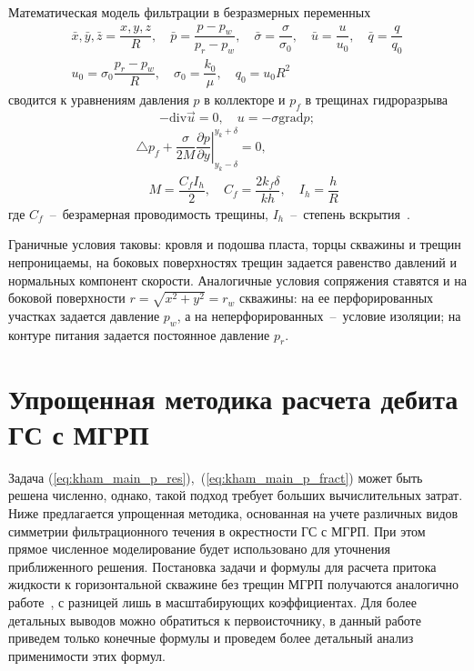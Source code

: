 \documentclass{article}
\begin{document}
Математическая модель фильтрации в безразмерных переменных
\begin{equation}
  \displaystyle
  \begin{gathered}
    \bar{x},\bar{y},\bar{z} = \dfrac{x,y,z}{R}, \quad
    \bar{p} = \dfrac{p - p_w}{p_r - p_w}, \quad
    \bar{\sigma} = \dfrac{\sigma}{\sigma_0}, \quad
    \bar{u}=\dfrac{u}{u_0},  \quad
    \bar{q} = \dfrac{q}{q_0}    \\
    u_0 = \sigma_0 \dfrac{p_r - p_w}{R}, \quad
    \sigma_0 = \dfrac{k_0}{\mu}, \quad
    q_0 = u_0 R^2
  \end{gathered}
  \label{eq:kham_dimless}
\end{equation}
сводится  к уравнениям  давления $p$ в коллекторе и $p_f$ в трещинах
гидроразрыва~\cite{ref:kham_mazo_uzku_2015}
\begin{equation}
  \displaystyle
  - \text{div} \vec{u} = 0, \quad u=-\sigma \text{grad} p;
  \label{eq:kham_main_p_res}
\end{equation}
\begin{equation}
  \displaystyle
  \begin{gathered}
    \triangle p_f + \dfrac{\sigma}{2M}\left.\dfrac{\partial p}{\partial y} \right|_{y_k - \delta}^{y_k + \delta} = 0, \\[8pt]
    \quad M = \dfrac{C_f I_h}{2}, \quad C_f = \dfrac{2 k_f \delta}{k h}, \quad I_h=\dfrac{h}{R}
  \end{gathered}
  \label{eq:kham_main_p_fract}
\end{equation}
где $C_f$~--~безрамерная проводимость трещины, $I_h$~--~степень
вскрытия~\cite{lit:kham_valko_economides_2001}.

Граничные условия таковы: кровля и подошва пласта, торцы скважины и трещин
непроницаемы, на боковых поверхностях трещин задается равенство давлений и
нормальных компонент скорости. Аналогичные условия сопряжения ставятся и на
боковой поверхности $r=\sqrt{x^2 + y^2} = r_w$ скважины: на ее перфорированных участках задается давление $p_w$, а на неперфорированных~--~условие изоляции; на контуре питания задается постоянное давление $p_r$.

\section{Упрощенная методика расчета дебита ГС с МГРП}
Задача (\ref{eq:kham_main_p_res}),~(\ref{eq:kham_main_p_fract}) может быть
решена численно, однако, такой подход требует больших вычислительных затрат.
Ниже предлагается упрощенная методика, основанная на учете различных видов симметрии фильтрационного течения в окрестности ГС с МГРП. При этом прямое численное моделирование будет использовано для уточнения приближенного решения.
Постановка задачи и формулы для расчета притока жидкости к горизонтальной
скважине без трещин МГРП получаются аналогично работе~\cite{ref:kham_mazo_uzku_2015},
с разницей лишь в масштабирующих коэффициентах. Для более детальных выводов
можно обратиться к первоисточнику, в данный работе приведем только конечные
формулы и проведем более детальный анализ применимости этих формул.
\end{document}
